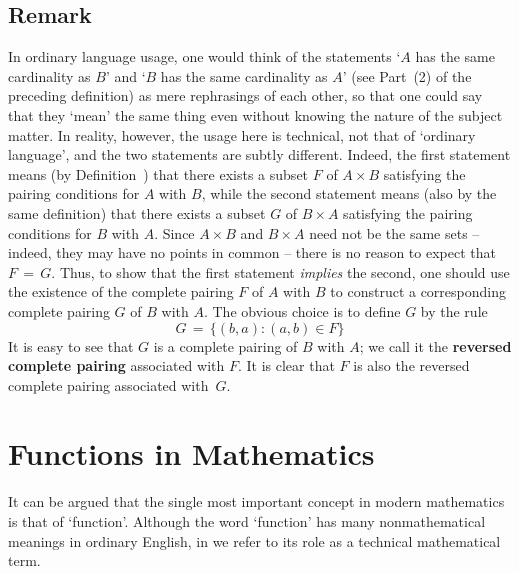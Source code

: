 {\V

        \subsection{\small{\bf Remark}}
            \label{RemrkA12.80}

        In ordinary language usage, one would think of the statements `$A$ has the same cardinality as $B$' and `$B$ has the same cardinality as $A$'
    (see Part~(2) of the preceding definition) as mere rephrasings of each other,
    so that one could say that they `mean' the same thing even without knowing the nature of the subject matter.
    In reality, however, the usage here is technical, not that of `ordinary language', and the two statements are subtly different.
    Indeed, the first statement means (by Definition~) that there exists a subset $F$ of $A{\times}B$ satisfying the pairing conditions for $A$ with $B$,
    while the second statement means (also by the same definition) that there exists a subset $G$ of $B{\times}A$ satisfying the pairing conditions for $B$ with $A$.
    Since $A{\times}B$ and $B{\times}A$ need not be the same sets -- indeed, they may have no points in common --
    there is no reason to expect that $F \,=\, G$. Thus, to show that the first statement {\em implies} the second,
    one should use the existence of the complete pairing $F$ of $A$ with $B$ to construct a corresponding complete pairing $G$ of $B$ with $A$.
    The obvious choice is to define $G$ by the rule
        \begin{displaymath}
        G \,=\, \{(b,a): (a,b){\in}F\}
        \end{displaymath}
    It is easy to see that $G$ is a complete pairing of $B$ with $A$; we call it the {\bf reversed complete pairing}
     associated with $F$.
    It is clear that $F$ is also the reversed complete pairing associated with~$G$.
}%

                        \section{Functions in Mathematics}
                        \label{SectA30}

    It can be argued that the single most important concept in modern mathematics is that of `function'.
    Although the word `function' has many nonmathematical meanings in ordinary English, in {\TheseNotes} we refer to its role as a technical mathematical term.

